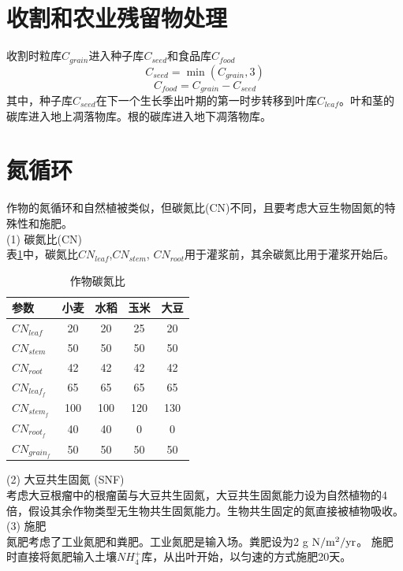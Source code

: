 \section{收割和农业残留物处理}
收割时粒库$C_{grain}$进入种子库$C_{seed}$和食品库$C_{food}$
\begin{equation}
{C}_{ {seed }}=\min \left({C}_{ {grain }}, 3\right)
\end{equation}
\begin{equation}
{C}_{ {food }}={C}_{ {grain }}-{C}_{ {seed }}
\end{equation}
其中，种子库$C_{seed}$在下一个生长季出叶期的第一时步转移到叶库$C_{leaf}$。叶和茎的碳库进入地上凋落物库。根的碳库进入地下凋落物库。
\section{氮循环}
作物的氮循环和自然植被类似，但碳氮比(CN)不同，且要考虑大豆生物固氮的特殊性和施肥。\\
(1) 碳氮比(CN)\\
表\ref{tab:作物碳氮比}中，碳氮比$CN_{leaf}$,$ CN_{stem}$, $CN_{root}$用于灌浆前，其余碳氮比用于灌浆开始后。\\
\begin{table}[]
  \centering
  \caption{作物碳氮比}
  \label{tab:作物碳氮比}
\begin{tabular}{@{}lcccc@{}}
\toprule
参数         & 小麦  & 水稻  & 玉米  & 大豆  \\ \midrule
$CN_{leaf}$     & 20  & 20  & 25  & 20  \\
$CN_{stem}$     & 50  & 50  & 50  & 50  \\
$CN_{root}$     & 42  & 42  & 42  & 42  \\
$CN_{leaf_f}$  & 65  & 65  & 65  & 65  \\
$CN_{stem_f}$  & 100 & 100 & 120 & 130 \\
$CN_{root_f}$  & 40  & 40  & 0   & 0   \\
$CN_{grain_f}$ & 50  & 50  & 50  & 50  \\ \bottomrule
\end{tabular}
\end{table}
(2) 大豆共生固氮 (SNF)\\
考虑大豆根瘤中的根瘤菌与大豆共生固氮，大豆共生固氮能力设为自然植物的4倍，假设其余作物类型无生物共生固氮能力。生物共生固定的氮直接被植物吸收。\\
(3) 施肥\\
氮肥考虑了工业氮肥和粪肥。工业氮肥是输入场。粪肥设为2 g $\rm N/m^2/yr$。
施肥时直接将氮肥输入土壤$NH_4^{+}$库，从出叶开始，以匀速的方式施肥20天。

